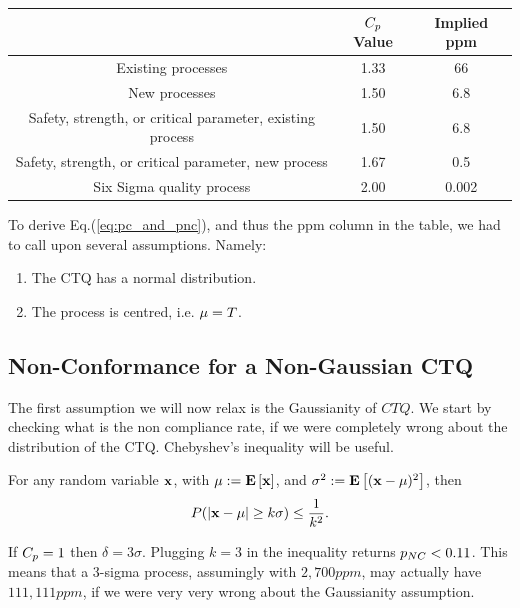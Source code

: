 \begin{tabular}{|c|c|c|}
\hline  & $C_p$ Value & Implied ppm \\ 
\hline \hline Existing processes
 & 1.33
 & 66 \\ 
\hline New processes
 & 1.50
 & 6.8 \\ 
\hline Safety, strength, or critical
parameter, existing process
 & 1.50
 & 6.8 \\ 
\hline Safety, strength, or critical
parameter, new process
 & 1.67
 & 0.5 \\ 
\hline Six Sigma quality process & 2.00 &  0.002 \\ 
\hline 
\end{tabular} 

\bigskip

To derive Eq.(\ref{eq:pc_and_pnc}), and thus the ppm column in the table, we had to call upon several assumptions.
Namely:
\begin{enumerate}
\item The CTQ has a normal distribution.
\item The process is centred, i.e. $\mu=T$.
\end{enumerate}








\subsection{Non-Conformance for a Non-Gaussian CTQ}
The first assumption we will now relax is the Gaussianity of $CTQ$. 
We start by checking what is the non compliance rate, if we were completely wrong about the distribution of the CTQ. 
Chebyshev's inequality will be useful.


\begin{theorem}
For any random variable $\mathbf{x}$, with $\mu:=\mathbf{E}\left[ \mathbf{x} \right]$, and $\sigma^2:=\mathbf{E}\left[ (\mathbf{x}-\mu)^2 \right]$, then
\begin{align}
	P(|\mathbf{x}-\mu| \geq k\sigma) \leq \frac{1}{k^2}.
\end{align}
\end{theorem}
If $C_p=1$  then $\delta=3\sigma$. Plugging $k=3$ in the inequality returns $p_{NC}<0.11$.
This means that a 3-sigma process, assumingly with $2,700 ppm$, may actually have $111,111 ppm$, if we were very very wrong about the Gaussianity assumption.


